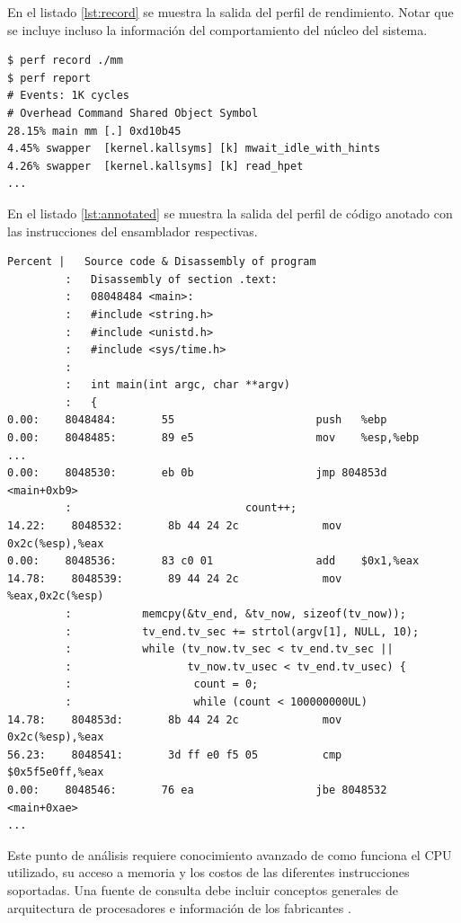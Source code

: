 \documentclass[a4paper]{report}
\begin{document}
En el listado \ref{lst:record} se muestra la salida del perfil de rendimiento. Notar que se incluye incluso la información del comportamiento del núcleo del sistema.

\begin{lstlisting}[caption={Perfil de Rendimiento},label={lst:record}]
$ perf record ./mm
$ perf report
# Events: 1K cycles
# Overhead Command Shared Object Symbol
28.15% main mm [.] 0xd10b45
4.45% swapper  [kernel.kallsyms] [k] mwait_idle_with_hints
4.26% swapper  [kernel.kallsyms] [k] read_hpet
...
\end{lstlisting}

En el listado \ref{lst:annotated} se muestra la salida del perfil de código anotado con las instrucciones del ensamblador respectivas.

\begin{lstlisting}[caption={Código Anotado},label={lst:annotated}]
 Percent |   Source code & Disassembly of program
         :   Disassembly of section .text:
         :   08048484 <main>:
         :   #include <string.h>
         :   #include <unistd.h>
         :   #include <sys/time.h>
         :
         :   int main(int argc, char **argv)
         :   {
0.00:    8048484:       55                      push   %ebp
0.00:    8048485:       89 e5                   mov    %esp,%ebp
...
0.00:    8048530:       eb 0b                   jmp 804853d <main+0xb9>
         :                           count++;
14.22:    8048532:       8b 44 24 2c             mov    0x2c(%esp),%eax
0.00:    8048536:       83 c0 01                add    $0x1,%eax
14.78:    8048539:       89 44 24 2c             mov    %eax,0x2c(%esp)
         :           memcpy(&tv_end, &tv_now, sizeof(tv_now));
         :           tv_end.tv_sec += strtol(argv[1], NULL, 10);
         :           while (tv_now.tv_sec < tv_end.tv_sec ||
         :                  tv_now.tv_usec < tv_end.tv_usec) {
         :                   count = 0;
         :                   while (count < 100000000UL)
14.78:    804853d:       8b 44 24 2c             mov    0x2c(%esp),%eax
56.23:    8048541:       3d ff e0 f5 05          cmp    $0x5f5e0ff,%eax
0.00:    8048546:       76 ea                   jbe 8048532 <main+0xae>
...
\end{lstlisting}

Este punto de análisis requiere conocimiento avanzado de como funciona el CPU utilizado, su acceso a memoria y los costos de las diferentes instrucciones soportadas. 
Una fuente de consulta debe incluir conceptos generales de arquitectura de procesadores \cite{hennessy} e información de los fabricantes \cite{intel-optimization}.
\end{document}
